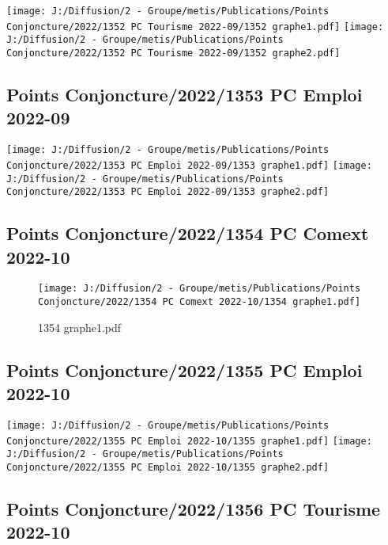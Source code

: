 \documentclass[
]{article}
\begin{document}
\texttt{[image: J:/Diffusion/2 - Groupe/metis/Publications/Points Conjoncture/2022/1352 PC Tourisme 2022-09/1352 graphe1.pdf]}
\texttt{[image: J:/Diffusion/2 - Groupe/metis/Publications/Points Conjoncture/2022/1352 PC Tourisme 2022-09/1352 graphe2.pdf]}

\hypertarget{points-conjoncture20221353-pc-emploi-2022-09}{%
\subsection{Points Conjoncture/2022/1353 PC Emploi
2022-09}\label{points-conjoncture20221353-pc-emploi-2022-09}}

\texttt{[image: J:/Diffusion/2 - Groupe/metis/Publications/Points Conjoncture/2022/1353 PC Emploi 2022-09/1353 graphe1.pdf]}
\texttt{[image: J:/Diffusion/2 - Groupe/metis/Publications/Points Conjoncture/2022/1353 PC Emploi 2022-09/1353 graphe2.pdf]}

\hypertarget{points-conjoncture20221354-pc-comext-2022-10}{%
\subsection{Points Conjoncture/2022/1354 PC Comext
2022-10}\label{points-conjoncture20221354-pc-comext-2022-10}}

\begin{figure}
\centering
\texttt{[image: J:/Diffusion/2 - Groupe/metis/Publications/Points Conjoncture/2022/1354 PC Comext 2022-10/1354 graphe1.pdf]}
\caption{1354 graphe1.pdf}
\end{figure}

\hypertarget{points-conjoncture20221355-pc-emploi-2022-10}{%
\subsection{Points Conjoncture/2022/1355 PC Emploi
2022-10}\label{points-conjoncture20221355-pc-emploi-2022-10}}

\texttt{[image: J:/Diffusion/2 - Groupe/metis/Publications/Points Conjoncture/2022/1355 PC Emploi 2022-10/1355 graphe1.pdf]}
\texttt{[image: J:/Diffusion/2 - Groupe/metis/Publications/Points Conjoncture/2022/1355 PC Emploi 2022-10/1355 graphe2.pdf]}

\hypertarget{points-conjoncture20221356-pc-tourisme-2022-10}{%
\subsection{Points Conjoncture/2022/1356 PC Tourisme
2022-10}\label{points-conjoncture20221356-pc-tourisme-2022-10}}
\end{document}

